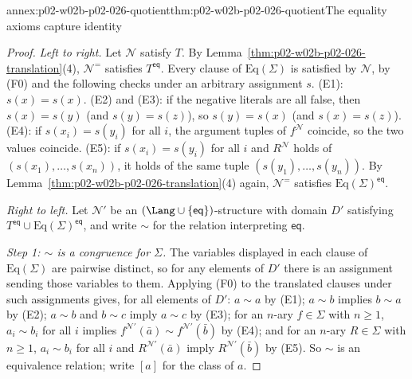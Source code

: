 \begin{annexitem}{annex:p02-w02b-p02-026-quotient}{thm:p02-w02b-p02-026-quotient}{The equality axioms capture identity}
\begin{proof}
\emph{Left to right.}  Let \(\mathcal N\) satisfy \(T\).  By
Lemma~\ref{thm:p02-w02b-p02-026-translation}(4), \(\mathcal N^{=}\) satisfies
\(T^{\mathsf{eq}}\).  Every clause of \(\mathrm{Eq}(\Sigma)\) is satisfied by
\(\mathcal N\), by (F0) and the following checks under an arbitrary assignment
\(s\).  (E1): \(s(x)=s(x)\).  (E2) and (E3): if the negative literals are all
false, then \(s(x)=s(y)\) (and \(s(y)=s(z)\)), so \(s(y)=s(x)\) (and
\(s(x)=s(z)\)).  (E4): if \(s(x_i)=s(y_i)\) for all \(i\), the argument tuples
of \(f^{\mathcal N}\) coincide, so the two values coincide.  (E5): if
\(s(x_i)=s(y_i)\) for all \(i\) and \(R^{\mathcal N}\) holds of
\((s(x_1),\ldots,s(x_n))\), it holds of the same tuple
\((s(y_1),\ldots,s(y_n))\).  By
Lemma~\ref{thm:p02-w02b-p02-026-translation}(4) again, \(\mathcal N^{=}\)
satisfies \(\mathrm{Eq}(\Sigma)^{\mathsf{eq}}\).

\emph{Right to left.}  Let \(\mathcal N'\) be an
\((\Lang\cup\{\mathsf{eq}\})\)-structure with domain \(D'\) satisfying
\(T^{\mathsf{eq}}\cup\mathrm{Eq}(\Sigma)^{\mathsf{eq}}\), and write \(\sim\) for
the relation interpreting \(\mathsf{eq}\).

\emph{Step 1: \(\sim\) is a congruence for \(\Sigma\).}  The variables
displayed in each clause of \(\mathrm{Eq}(\Sigma)\) are pairwise distinct, so
for any elements of \(D'\) there is an assignment sending those variables to
them.  Applying (F0) to the translated clauses under such assignments gives,
for all elements of \(D'\): \(a\sim a\) by (E1); \(a\sim b\) implies \(b\sim a\)
by (E2); \(a\sim b\) and \(b\sim c\) imply \(a\sim c\) by (E3); for an
\(n\)-ary \(f\in\Sigma\) with \(n\geq1\), \(a_i\sim b_i\) for all \(i\) implies
\(f^{\mathcal N'}(\bar a)\sim f^{\mathcal N'}(\bar b)\) by (E4); and for an
\(n\)-ary \(R\in\Sigma\) with \(n\geq1\), \(a_i\sim b_i\) for all \(i\) and
\(R^{\mathcal N'}(\bar a)\) imply \(R^{\mathcal N'}(\bar b)\) by (E5).  So
\(\sim\) is an equivalence relation; write \([a]\) for the class of \(a\).


\end{proof}
\end{annexitem}
